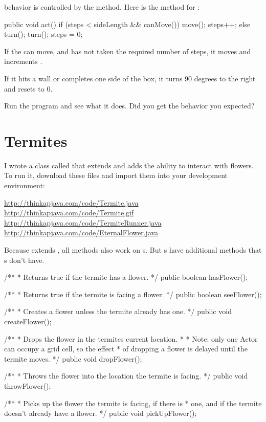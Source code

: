  behavior is controlled by the  method.
Here is the  method for :

\begin{code}
    public void act() {
        if (steps < sideLength && canMove()) {
            move();
            steps++;
        }
        else {
            turn();
            turn();
            steps = 0;
        }
    }
\end{code}

If the  can move, and has not taken the required number of steps, it moves and increments .

If it hits a wall or completes one side of the box, it turns 90 degrees to the right and resets  to 0.

Run the program and see what it does.
Did you get the behavior you expected?


\section{Termites}

I wrote a class called  that extends  and adds the ability to interact with flowers.
To run it, download these files and import them into your development environment:

\url{http://thinkapjava.com/code/Termite.java} \\
\url{http://thinkapjava.com/code/Termite.gif} \\
\url{http://thinkapjava.com/code/TermiteRunner.java} \\
\url{http://thinkapjava.com/code/EternalFlower.java}

Because  extends , all  methods also work on s.
But s have additional methods that s don't have.

\begin{code}
    /**
     * Returns true if the termite has a flower.
     */
    public boolean hasFlower();

    /**
     * Returns true if the termite is facing a flower.
     */
    public boolean seeFlower();

    /**
     * Creates a flower unless the termite already has one.
     */
    public void createFlower();

    /**
     * Drops the flower in the termites current location.
     *
     * Note: only one Actor can occupy a grid cell, so the effect
     * of dropping a flower is delayed until the termite moves.
     */
    public void dropFlower();

    /**
     * Throws the flower into the location the termite is facing.
     */
    public void throwFlower();

    /**
     * Picks up the flower the termite is facing, if there is
     * one, and if the termite doesn't already have a flower.
     */
    public void pickUpFlower();
\end{code}

